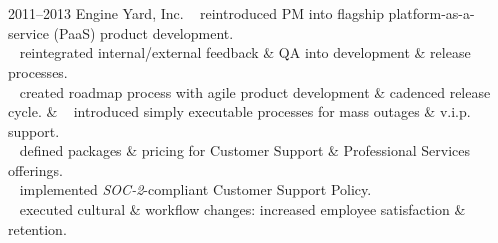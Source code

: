 \documentclass[]{friggeri-cv} %
\begin{document}

\section{{}{} {\normalsize{}~~}}

\begin{entrylist}
\entry
{2011--2013}
{Engine Yard, Inc.}
{}
{{\tiny {}} ~ reintroduced PM into flagship platform-as-a-service (PaaS) product development.\\
{\tiny {}} ~ reintegrated internal/external feedback \& QA into development \& release processes.\\
{\tiny {}} ~ created roadmap process with agile product development \& cadenced release cycle.}
\entry
{}
{}
{ \& }
{{\tiny {}} ~ introduced simply executable processes for mass outages \& v.i.p. support.\\
{\tiny {}} ~ defined packages \& pricing for Customer Support \& Professional Services offerings.\\
{\tiny {}} ~ implemented \emph{SOC-2}-compliant Customer Support Policy.\\

{\tiny {}} ~ executed cultural \& workflow changes: increased employee satisfaction \& retention.\\

}
\end{entrylist}
\end{document}
